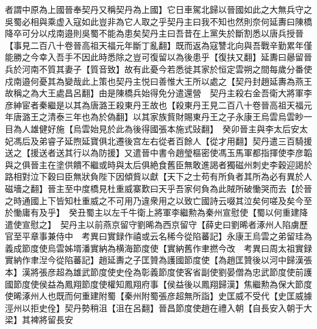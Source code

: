 者謂中原為上國晉奉契丹又稱契丹為上國】它日車駕北歸以晉國如此之大無兵守之吳蜀必相與乘虚入寇如此豈非為它人取之乎契丹主曰我不知也然則奈何延夀曰陳橋降卒可分以戍南邉則吳蜀不能為患矣契丹主曰吾昔在上黨失於斷割悉以唐兵授晉【事見二百八十卷晉高祖天福元年斷丁亂翻】既而返為寇讐北向與吾戰辛勤累年僅能勝之今幸入吾手不因此時悉除之豈可復留以為後患乎【復扶又翻】延夀曰曏留晉兵於河南不質其妻子【質音致】故有此憂今若悉徙其家於恒定雲朔之間每歲分番使戍南邉何憂其為變哉此上策也契丹主悦曰善惟大王所以處之【契丹封趙延夀為燕王故稱之為大王處昌呂翻】由是陳橋兵始得免分遣還營　契丹主殺右金吾衛大將軍李彦紳宦者秦繼是以其為唐潞王殺東丹王故也【殺東丹王見二百八十卷晉高祖天福元年唐潞王之清泰三年也為於偽翻】以其家族貲財賜東丹王之子永康王烏雲烏雲眇一目為人雄健好施【烏雲始見於此為後得國張本施式䜴翻】　癸卯晉主與李太后安太妃馮后及弟睿子延煦延寶俱北遷後宫左右從者百餘人【從才用翻】契丹遣三百騎援送之【援送者送其行以為防援】又遣晉中書令趙瑩樞密使馮玉馬軍都指揮使李彦韜與之俱晉主在塗供饋不繼或時與太后俱絶食舊臣無敢進謁者獨磁州刺史李穀迎謁於路相對泣下穀曰臣無狀負陛下因傾貲以獻【天下之士苟有所負者其所為必有異於人磁墻之翻】晉主至中度橋見杜重威寨歎曰天乎吾家何負為此賊所破慟哭而去【於晉之時通國上下皆知杜重威之不可用乃違衆用之以致亡國詩云啜其泣矣何嗟及矣今至於慟庸有及乎】　癸丑蜀主以左千牛衛上將軍李繼勲為秦州宣慰使【蜀以何重建降遣使宣慰之】　契丹主以前燕京留守劉晞為西京留守【薛史曰劉晞者涿州人陷虜歷官至平章事兼侍中　考異曰實録作禧或云名稀今從陷蕃記】永康王烏雲之弟留珪為義成節度使烏雲姊壻潘實納為横海節度使【實納舊作聿撚今改　考異曰周太祖實録實納作聿湼今從陷蕃記】趙延夀之子匡贊為護國節度使【為趙匡贊後以河中歸漢張本】漢將張彦超為雄武節度使史佺為彰義節度使客省副使劉晏僧為忠武節度使前護國節度使侯益為鳳翔節度使權知鳳翔府事【侯益後以鳳翔歸漢】焦繼勲為保大節度使晞涿州人也既而何重建附蜀【秦州附蜀張彦超無所詣】史匡威不受代【史匡威據涇州以拒史佺】契丹勢稍沮【沮在呂翻】晉昌節度使趙在禮入朝【自長安入朝于大梁】其裨將留長安

